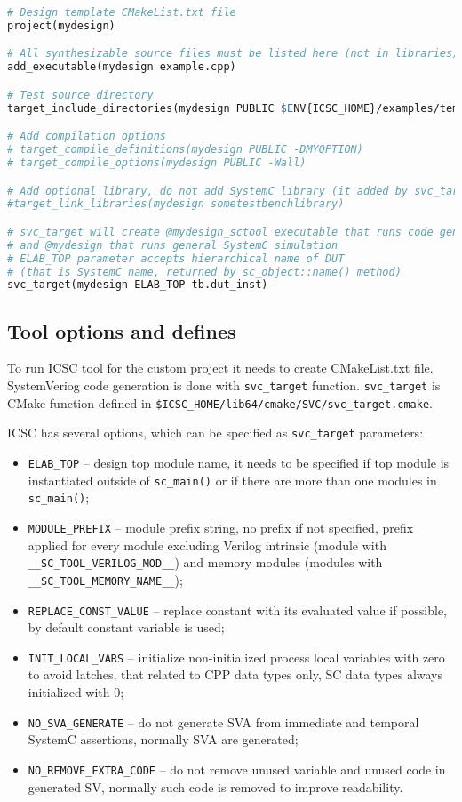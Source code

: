\begin{lstlisting}[language=make,caption=CMakeList.txt file for design template]
# Design template CMakeList.txt file
project(mydesign)

# All synthesizable source files must be listed here (not in libraries)
add_executable(mydesign example.cpp)

# Test source directory
target_include_directories(mydesign PUBLIC $ENV{ICSC_HOME}/examples/template)

# Add compilation options
# target_compile_definitions(mydesign PUBLIC -DMYOPTION)
# target_compile_options(mydesign PUBLIC -Wall)

# Add optional library, do not add SystemC library (it added by svc_target)
#target_link_libraries(mydesign sometestbenchlibrary)

# svc_target will create @mydesign_sctool executable that runs code generation 
# and @mydesign that runs general SystemC simulation
# ELAB_TOP parameter accepts hierarchical name of DUT  
# (that is SystemC name, returned by sc_object::name() method)
svc_target(mydesign ELAB_TOP tb.dut_inst)
\end{lstlisting}
 

\subsection{Tool options and defines}\label{section:tool_options}

To run ICSC tool for the custom project it needs to create CMakeList.txt file. SystemVeriog code generation is done with {\tt svc\_target} function. {\tt svc\_target} is CMake function defined in {\tt \$ICSC\_HOME/lib64/cmake/SVC/svc\_target.cmake}.

ICSC has several options, which can be specified as {\tt svc\_target} parameters:

\begin{itemize}
\item {\tt ELAB\_TOP} – design top module name, it needs to be specified if top module is instantiated outside of {\tt sc\_main()} or if there are more than one modules in {\tt sc\_main()};
\item {\tt MODULE\_PREFIX} – module prefix string, no prefix if not specified, prefix applied for every module excluding Verilog intrinsic (module with {\tt \_\_SC\_TOOL\_VERILOG\_MOD\_\_}) and memory modules (modules with {\tt \_\_SC\_TOOL\_MEMORY\_NAME\_\_});
\item {\tt REPLACE\_CONST\_VALUE} – replace constant with its evaluated value if possible, by default constant variable is used;
\item {\tt INIT\_LOCAL\_VARS} – initialize non-initialized process local variables with zero to avoid latches, that related to CPP data types only, SC data types always initialized with 0;
\item {\tt NO\_SVA\_GENERATE} – do not generate SVA from immediate and temporal SystemC assertions, normally SVA are generated;
\item {\tt NO\_REMOVE\_EXTRA\_CODE} – do not remove unused variable and unused code in generated SV, normally such code is removed to improve readability.
\end{itemize}

